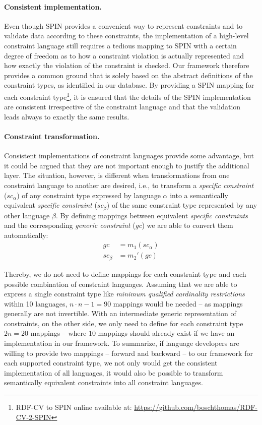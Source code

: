 \documentclass[a4paper,fontsize=11pt]{scrartcl}
\begin{document}
\paragraph{Consistent implementation.}
Even though SPIN provides a convenient way to represent constraints and to validate data according to these constraints, the implementation of a high-level constraint language still requires a tedious mapping to SPIN with a certain degree of freedom as to how a constraint violation is actually represented and how exactly the violation of the constraint is checked.
Our framework therefore provides a common ground that is solely based on the abstract definitions of the constraint types, as identified in our database. By providing a SPIN mapping
for each constraint type\footnote{RDF-CV to SPIN online available at: \url{https://github.com/boschthomas/RDF-CV-2-SPIN}\label{RDF-CV-2-SPIN}}, it is ensured that the details of the SPIN implementation are consistent irrespective of the constraint language and that the validation leads always to exactly the same results.  


\paragraph{Constraint transformation.} Consistent implementations of constraint languages provide some advantage, but it could be argued that they are not important enough to justify the additional layer. The situation, however, is different when transformations from one constraint language to another are desired, i.e., to transform a \emph{specific constraint} (\emph{$sc_{\alpha}$}) of any constraint type expressed by language \emph{$\alpha$} into a semantically equivalent \emph{specific constraint} (\emph{$sc_{\beta}$}) of the same constraint type represented by any other language \emph{$\beta$}.
By defining mappings between equivalent \emph{specific constraints} and the corresponding \emph{generic constraint} (\emph{gc}) we are able to convert them automatically: 
\begin{align*}
  gc &=  m_1(sc_{\alpha}) \\
  sc_{\beta} &= m_2'(gc) 
\end{align*}

Thereby, we do not need to define mappings for each constraint type and each possible combination of constraint languages. Assuming that we are able to express a single constraint type like \emph{minimum qualified cardinality restrictions} within 10 languages, $n \cdot n-1 = 90$ mappings would be needed -- as mappings generally are not invertible. 
With an intermediate generic representation of constraints, on the other side, we only need to define for each constraint type $2n = 20$ mappings -- where $10$ mappings should already exist if we have an implementation in our framework. 
To summarize, if language developers are willing to provide two mappings -- forward and backward -- to our framework for each supported constraint type, we not only would get the consistent implementation of all languages, it would also be possible to transform semantically equivalent constraints into all constraint languages.
\end{document}
